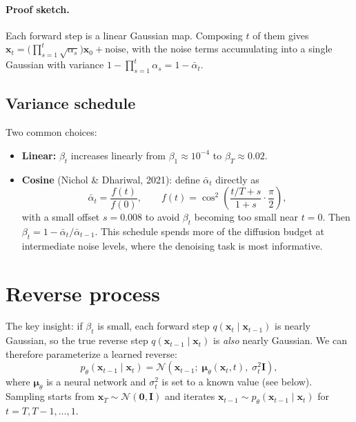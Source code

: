 \documentclass[11pt]{article}
\newcommand{\xb}{\bm{x}}
\newcommand{\abar}{\bar{\alpha}}
\newcommand{\N}{\mathcal{N}}
\begin{document}
\paragraph{Proof sketch.}
Each forward step is a linear Gaussian map.  Composing $t$ of them gives
$\xb_t = \bigl(\prod_{s=1}^t \sqrt{\alpha_s}\bigr)\xb_0 + \text{noise}$,
with the noise terms accumulating into a single Gaussian with variance
$1 - \prod_{s=1}^t \alpha_s = 1 - \abar_t$.

\subsection{Variance schedule}

Two common choices:
\begin{itemize}
    \item \textbf{Linear:} $\beta_t$ increases linearly from $\beta_1
          \approx 10^{-4}$ to $\beta_T \approx 0.02$.
    \item \textbf{Cosine} (Nichol \& Dhariwal, 2021): define $\abar_t$
          directly as
          \[
              \abar_t = \frac{f(t)}{f(0)},
              \qquad f(t) = \cos^2\!\left(\frac{t/T + s}{1+s}
              \cdot \frac{\pi}{2}\right),
          \]
          with a small offset $s=0.008$ to avoid $\beta_t$ becoming too
          small near $t=0$.  Then $\beta_t = 1 - \abar_t / \abar_{t-1}$.
          This schedule spends more of the diffusion budget at intermediate
          noise levels, where the denoising task is most informative.
\end{itemize}

\section{Reverse process}

The key insight: if $\beta_t$ is small, each forward step
$q(\xb_t \mid \xb_{t-1})$ is nearly Gaussian, so the true reverse step
$q(\xb_{t-1} \mid \xb_t)$ is \emph{also} nearly Gaussian.  We can therefore
parameterize a learned reverse:
\begin{equation}
    p_\theta(\xb_{t-1} \mid \xb_t)
    = \N\!\left(\xb_{t-1};\; \bm{\mu}_\theta(\xb_t, t),\;
      \sigma_t^2 \bm{I}\right),
\end{equation}
where $\bm{\mu}_\theta$ is a neural network and $\sigma_t^2$ is set to
a known value (see below).  Sampling starts from $\xb_T \sim \N(\bm{0},
\bm{I})$ and iterates $\xb_{t-1} \sim p_\theta(\xb_{t-1} \mid \xb_t)$ for
$t = T, T{-}1, \ldots, 1$.
\end{document}
